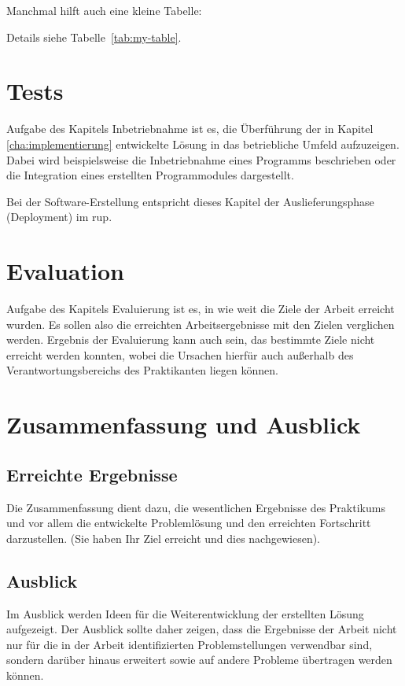 \documentclass[oneside]{ausarbeitung}
\begin{document}
Manchmal hilft auch eine kleine Tabelle:



Details siehe Tabelle~\ref{tab:my-table}.
\chapter{Tests}
\label{cha:tests}

Aufgabe des Kapitels Inbetriebnahme ist es, die Überführung der in 
Kapitel \ref{cha:implementierung} entwickelte Lösung in das betriebliche 
Umfeld aufzuzeigen. Dabei wird beispielsweise die Inbetriebnahme eines 
Programms beschrieben oder die Integration eines erstellten 
Programmodules dargestellt.

Bei der Software-Erstellung entspricht dieses Kapitel der 
Auslieferungsphase (Deployment) im \ac{rup}.

\chapter{Evaluation}
\label{cha:evaluation}
Aufgabe des Kapitels Evaluierung ist es, in wie weit die Ziele der 
Arbeit erreicht wurden. Es sollen also die erreichten Arbeitsergebnisse 
mit den Zielen verglichen werden. Ergebnis der Evaluierung kann auch 
sein, das bestimmte Ziele nicht erreicht werden konnten, wobei die 
Ursachen hierfür auch außerhalb des Verantwortungsbereichs des 
Praktikanten liegen können.

\chapter{Zusammenfassung und Ausblick}
\label{cha:zusammenfassung}

\section{Erreichte Ergebnisse}
\label{sec:ergebnisse}

Die Zusammenfassung dient dazu, die wesentlichen Ergebnisse des 
Praktikums und vor allem die entwickelte Problemlösung und den 
erreichten Fortschritt darzustellen. (Sie haben Ihr Ziel erreicht und 
dies nachgewiesen).

\section{Ausblick}
\label{sec:ausblick}

Im Ausblick werden Ideen für die Weiterentwicklung der erstellten Lösung 
aufgezeigt. Der Ausblick sollte daher zeigen, dass die Ergebnisse der 
Arbeit nicht nur für die in der Arbeit identifizierten Problemstellungen 
verwendbar sind, sondern darüber hinaus erweitert sowie auf andere 
Probleme übertragen werden können.
\end{document}
